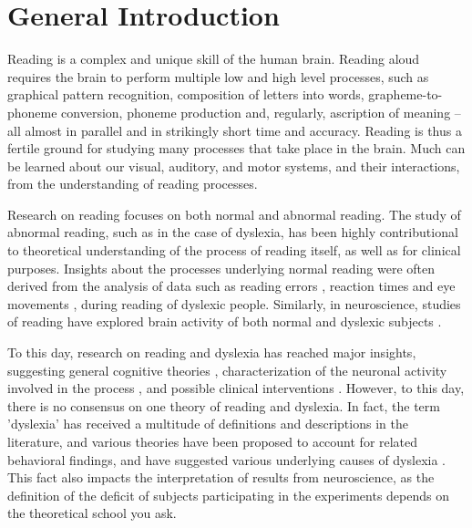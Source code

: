 \chapter*{General Introduction}

Reading is a complex and unique skill of the human brain. Reading aloud requires the brain to perform multiple low and high level processes, such as graphical pattern recognition, composition of letters into words, grapheme-to-phoneme conversion, phoneme production and, regularly, ascription of meaning – all almost in parallel and in strikingly short time and accuracy. Reading is thus a fertile ground for studying many processes that take place in the brain. Much can be learned about our visual, auditory, and motor systems, and their interactions, from the understanding of reading processes.

Research on reading focuses on both normal and abnormal reading. The study of abnormal reading, such as in the case of dyslexia, has been highly contributional to theoretical understanding of the process of reading itself, as well as for clinical purposes. Insights about the processes underlying normal reading were often derived from the analysis of data such as reading errors \citep{mn73, ck12}, reaction times \citep{s98, s00} and eye movements \citep{jainta2011dyslexic}, during reading of dyslexic people. Similarly, in neuroscience, studies of reading have explored brain activity of both normal and dyslexic subjects \citep{gaab2007neural, shaywitz2002disruption, price2012review}.

To this day, research on reading and dyslexia has reached major insights, suggesting general cognitive theories \cite{stanovich1988explaining, vellutino1995semantic, ramus2003relationship, amitay2003reply, ck12}, characterization of the neuronal activity involved in the process \citep{joubert2004neural, gaab2007neural, dehaene2010children}, and possible clinical interventions \citep{coltheart1989treatment, aylward2003instructional, kipp2008remediation}. However, to this day, there is no consensus on one theory of reading and dyslexia. In fact, the term 'dyslexia' has received a multitude of definitions and descriptions in the literature, and various theories have been proposed to account for related behavioral findings, and have suggested various underlying causes of dyslexia \citep{eg14}. This fact also impacts the interpretation of results from neuroscience, as the definition of the deficit of subjects participating in the experiments depends on the theoretical school you ask. 


